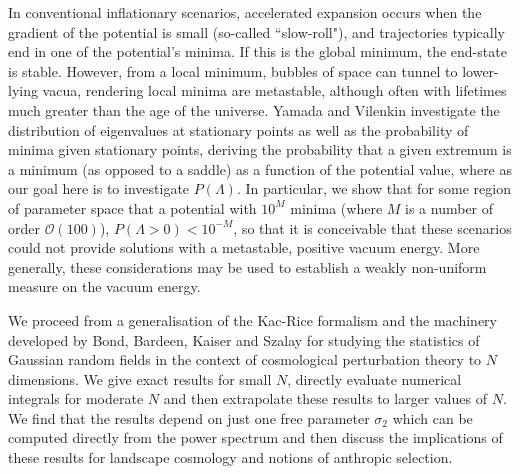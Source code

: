 \documentclass[12pt]{article}
\begin{document}

In conventional inflationary scenarios, accelerated expansion occurs when the gradient of the potential is small (so-called ``slow-roll"), and trajectories typically end in one of the potential's minima. If this is the global minimum, the end-state is stable. However, from  a local minimum, bubbles of space can tunnel to lower-lying vacua, rendering local minima are metastable, although often with lifetimes much greater than the age of the universe.  Yamada and Vilenkin \cite{Yamada2018} investigate the distribution of eigenvalues at stationary points as well as the probability of minima given stationary points, deriving the probability that a given extremum is a minimum (as opposed to a saddle) as a function of the potential value, where as our goal here is to investigate $P(\Lambda)$. In particular, we show that for some region of parameter space that a potential with $10^M$ minima (where $M$ is a number of order $\mathcal{O}(100)$), $P(\Lambda > 0) < 10^{-M}$, so that it is conceivable that these scenarios could not provide solutions with a metastable, positive vacuum energy. More generally, these considerations may be used to establish a weakly non-uniform measure on the vacuum energy. 

We proceed from a generalisation of the Kac-Rice formalism \cite{Kac1943,Rice1945} and the  machinery developed by Bond, Bardeen, Kaiser and Szalay  \cite{BBKS}  for studying the statistics of Gaussian random fields in the context of cosmological perturbation theory   to $N$ dimensions. We give exact results for small $N$, directly evaluate numerical integrals for moderate $N$ and then extrapolate these results to larger values of $N$. We find that the results depend on just one free parameter $\sigma_2$ which can be computed directly from the power spectrum and then discuss the implications of these results for landscape cosmology and notions of anthropic selection. 
\end{document}
